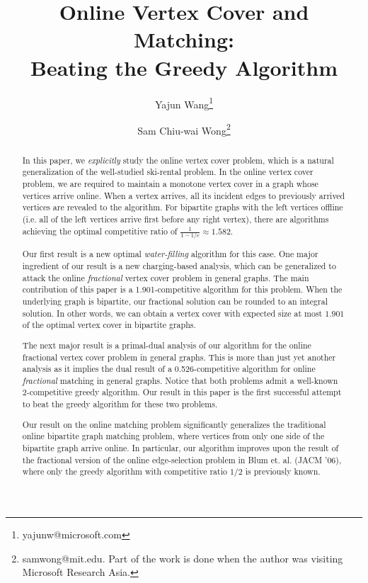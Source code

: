 \documentclass{article}
\begin{document}
\title{Online Vertex Cover and Matching:\\ Beating the Greedy Algorithm}


\author[1]{Yajun Wang\thanks{yajunw@microsoft.com}}
\author[2]{Sam Chiu-wai Wong\thanks{samwong@mit.edu. Part of the work is done when the author was visiting Microsoft Research Asia.}}


\maketitle
\begin{abstract}


In this paper, we {\em explicitly} study the online vertex cover problem, which is a natural generalization of the well-studied ski-rental problem. In the online vertex cover problem, we are required to maintain a monotone vertex cover in a graph whose vertices arrive online. When a vertex arrives, all its incident edges to previously arrived vertices are revealed to the algorithm. For bipartite graphs with the left vertices offline (i.e. all of the left vertices arrive first before any right vertex), there are algorithms achieving  the optimal competitive ratio of $\frac{1}{1-1/e}\approx 1.582$.

Our first result is a new optimal {\em water-filling} algorithm for this case. One major ingredient of our result is a new charging-based analysis, which can be generalized to attack the
online {\em fractional} vertex cover problem in general graphs. The main contribution of this paper is a 1.901-competitive algorithm for this problem. 
When the underlying graph is bipartite, our fractional solution can be rounded to an integral solution. In other words, we can obtain a vertex cover with expected size at most $1.901$ of the optimal vertex cover in bipartite graphs.

The next major result is a primal-dual analysis of our algorithm for the online fractional vertex cover problem in general graphs.  
This is more than just yet another analysis as it implies the dual result of a 0.526-competitive algorithm for online {\em fractional} matching in general graphs. Notice that both problems admit a well-known 2-competitive greedy algorithm. Our result in this paper is the first successful attempt to beat the greedy algorithm for these two problems. 


Our result on the online matching problem significantly generalizes the traditional online bipartite graph matching problem, where vertices from only one side of the bipartite graph arrive online. In particular, our algorithm improves upon the result of the fractional version of the online edge-selection problem in Blum et. al. (JACM '06), where only the greedy algorithm with competitive ratio $1/2$ is previously known. 









\end{abstract}
\end{document}
